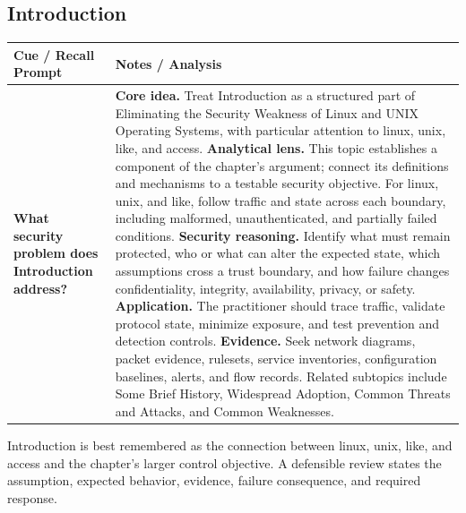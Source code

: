 \documentclass[11pt]{article}
\newcommand{\CornellHeader}{%
\rowcolor{Navy}\color{white}\bfseries Cue / Recall Prompt & \color{white}\bfseries Notes / Analysis\\\hline}
\newcommand{\CornellRow}[2]{%
\cellcolor{CueGray}\RaggedRight\textbf{#1} & \RaggedRight #2\\\hline}
\begin{document}
\subsection*{Introduction}
\begin{longtable}{>{\RaggedRight\arraybackslash}p{}|>{\RaggedRight\arraybackslash}p{}}
\CornellHeader
\CornellRow{What security problem does Introduction address?}{\textbf{Core idea.} Treat Introduction as a structured part of Eliminating the Security Weakness of Linux and UNIX Operating Systems, with particular attention to linux, unix, like, and access. \textbf{Analytical lens.} This topic establishes a component of the chapter's argument; connect its definitions and mechanisms to a testable security objective. For linux, unix, and like, follow traffic and state across each boundary, including malformed, unauthenticated, and partially failed conditions. \textbf{Security reasoning.} Identify what must remain protected, who or what can alter the expected state, which assumptions cross a trust boundary, and how failure changes confidentiality, integrity, availability, privacy, or safety. \textbf{Application.} The practitioner should trace traffic, validate protocol state, minimize exposure, and test prevention and detection controls. \textbf{Evidence.} Seek network diagrams, packet evidence, rulesets, service inventories, configuration baselines, alerts, and flow records. Related subtopics include Some Brief History, Widespread Adoption, Common Threats and Attacks, and Common Weaknesses.}
\end{longtable}
\begin{topicsummary}
Introduction is best remembered as the connection between linux, unix, like, and access and the chapter's larger control objective. A defensible review states the assumption, expected behavior, evidence, failure consequence, and required response.
\end{topicsummary}
\end{document}
